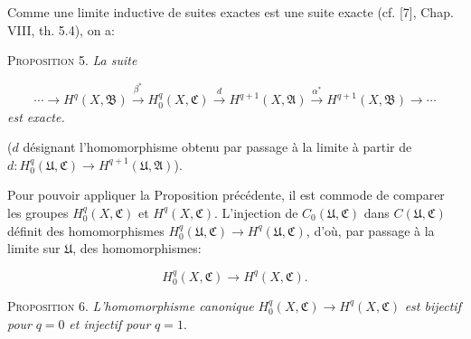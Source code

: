 %
%
%
Comme une limite inductive de suites exactes est une suite exacte (cf. [7], Chap. VIII, th. 5.4), on a:

\textsc{Proposition} 5. \textit{La suite}

\begin{equation*}
\cdots \longrightarrow H^q(X, \mathfrak{B}) \overset{\beta^*}{\longrightarrow} H_0^q(X, \mathfrak{C}) \overset{d}{\longrightarrow} H^{q+1}(X, \mathfrak{A}) \overset{\alpha^*}{\longrightarrow} H^{q+1}(X, \mathfrak{B}) \longrightarrow \cdots
\end{equation*}
\textit{est exacte.}

($d$ désignant l'homomorphisme obtenu par passage à la limite à partir de $d: H_0^q(\mathfrak{U}, \mathfrak{C}) \rightarrow H^{q+1}(\mathfrak{U}, \mathfrak{A})$).

Pour pouvoir appliquer la Proposition précédente, il est commode de comparer les groupes $H_0^q(X, \mathfrak{C})$ et $H^q(X, \mathfrak{C})$. L'injection de $C_0(\mathfrak{U}, \mathfrak{C})$ dans $C(\mathfrak{U}, \mathfrak{C})$ définit des homomorphismes $H_0^q(\mathfrak{U}, \mathfrak{C}) \rightarrow H^q(\mathfrak{U}, \mathfrak{C})$, d'où, par passage à la limite sur $\mathfrak{U}$, des homomorphismes:

\begin{equation*}
H_0^q(X, \mathfrak{C}) \longrightarrow H^q(X, \mathfrak{C}).
\end{equation*}

\textsc{Proposition} 6. \textit{L'homomorphisme canonique} $H_0^q(X, \mathfrak{C}) \rightarrow H^q(X, \mathfrak{C})$ \textit{est bijectif pour} $q = 0$ \textit{et injectif pour} $q = 1$.

